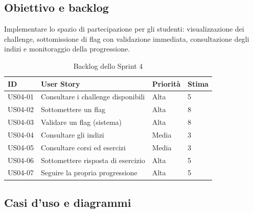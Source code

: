 \subsection{Obiettivo e backlog}
\label{subsec:sprint4-obiettivo}

Implementare lo spazio di partecipazione per gli studenti: visualizzazione dei challenge, sottomissione di flag con validazione immediata, consultazione degli indizi e monitoraggio della progressione.

\begin{table}[H]
    \centering
    \caption{Backlog dello Sprint 4}
    \label{tab:sprint4-backlog}
    \renewcommand{\arraystretch}{1.3}
    \begin{tabular}{|p{1.8cm}|p{7cm}|p{2.5cm}|p{1.5cm}|}
        \hline
        \textbf{ID} & \textbf{User Story} & \textbf{Priorità} & \textbf{Stima} \\
        \hline
        US04-01 & Consultare i challenge disponibili & Alta & 5 \\
        \hline
        US04-02 & Sottomettere un flag & Alta & 8 \\
        \hline
        US04-03 & Validare un flag (sistema) & Alta & 8 \\
        \hline
        US04-04 & Consultare gli indizi & Media & 3 \\
        \hline
        US04-05 & Consultare corsi ed esercizi & Media & 3 \\
        \hline
        US04-06 & Sottomettere risposta di esercizio & Alta & 5 \\
        \hline
        US04-07 & Seguire la propria progressione & Alta & 5 \\
        \hline
    \end{tabular}
\end{table}

\subsection{Casi d'uso e diagrammi}
\label{subsec:sprint4-casi-uso}

